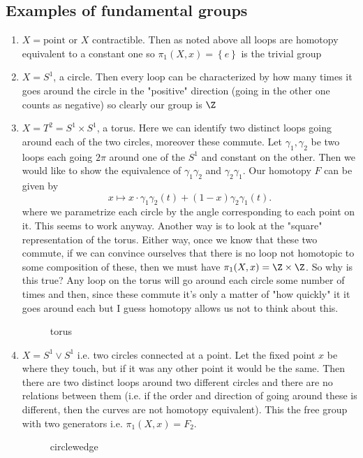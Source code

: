 \documentclass[a4paper]{article}
\begin{document}
\subsection*{Examples of fundamental groups}
\begin{enumerate}
    \item $X=\text{point}$ or $X$ contractible. Then as noted above all loops are homotopy equivalent to a constant one so  $\pi_1(X,x)=\left\{ e \right\} $ is the trivial group
    \item $X=S^{1}$, a circle. Then every loop can be characterized by how many times it goes around the circle in the "positive" direction (going in the other one counts as negative) so clearly our group is $\Z$
    \item $X=T^{2}=S^{1}\times S^{1}$, a torus. Here we can identify two distinct loops going around each of the two circles, moreover these commute. Let $\gamma_1,\gamma_2$ be two loops each going  $2\pi$ around one of the $S^{1}$ and constant on the other. Then we would like to show the equivalence of $\gamma_1\gamma_2$ and $\gamma_2\gamma_1$. Our homotopy $F$ can be given by  \[
            x\mapsto x\cdot \gamma_1\gamma_2(t)+(1-x)\gamma_2\gamma_1(t) 
        .\] where we parametrize each circle by the angle corresponding to each point on it. This seems to work anyway. Another way is to look at the "square" representation of the torus. Either way, once we know that these two commute, if we can convince ourselves that there is no loop not homotopic to some composition of these, then we must have $\pi_1(X,x)=\Z \times \Z$. So why is this true? Any loop on the torus will go around each circle some number of times and then, since these commute it's only a matter of "how quickly" it it goes around each but I guess homotopy allows us not to think about this.
\begin{figure}[ht]
    \centering
    \caption{torus}
    \label{fig:torus}
\end{figure}
\item $X=S^{1}\vee S^{1}$ i.e. two circles connected at a point. Let the fixed point $x$ be where they touch, but if it was any other point it would be the same. Then there are two distinct loops around two different circles and there are no relations between them (i.e. if the order and direction of going around these is different, then the curves are not homotopy equivalent). This the free group with two generators i.e. $\pi_1(X,x)=F_2$.
\begin{figure}[ht]
    \centering
    \caption{circlewedge}
    \label{fig:circlewedge}
\end{figure}
\end{enumerate}
\end{document}
